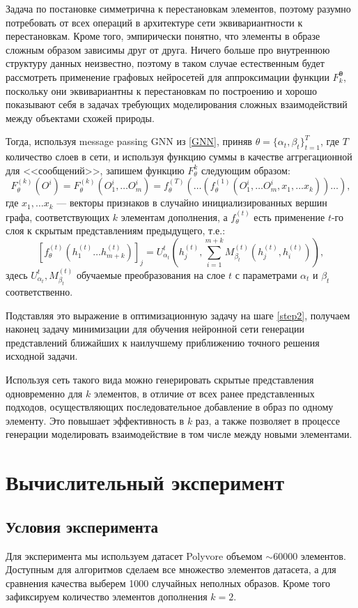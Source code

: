 \documentclass[a4paper,14pt]{extarticle}
\begin{document}
		
		Задача по постановке симметрична к перестановкам элементов, поэтому разумно потребовать от всех операций в архитектуре сети эквивариантности \cite{cohen2016group} к перестановкам. Кроме того, эмпирически понятно, что элементы в образе сложным образом зависимы друг от друга.
		Ничего больше про внутреннюю структуру данных неизвестно, поэтому в таком случае естественным будет рассмотреть применение графовых нейросетей для аппроксимации функции $F_k^\mathbf{\theta}$, поскольку они эквивариантны к перестановкам по построению и хорошо показывают себя в задачах требующих моделирования сложных взаимодействий между объектами схожей природы.
		
		Тогда, используя message passing GNN из \ref{GNN}, приняв $\theta = \{\alpha_t, \beta_t\}_{t=1}^{T}$, где $T$ количество слоев в сети, и используя функцию суммы в качестве аггрегационной для <<сообщений>>, запишем функцию $F^{k}_{\theta}$ следующим образом:
		$$F^{(k)}_{\theta}(O^i) = F^{(k)}_{\theta}(O^i_1,\dots O^i_m) = f_\theta^{(T)}\left(\dots \left(f_\theta^{(1)}(O^i_1,\dots O^i_m, x_1, \dots x_k)\right)\dots\right),$$
		где $x_1,\dots x_k$ --- векторы признаков в случайно инициализированных вершин графа, соответствующих $k$ элементам дополнения, а $f_\theta^{(t)}$ есть применение $t$-го слоя к скрытым представлениям предыдущего, т.е.:
		$$\left[f^{(t)}_\theta \left(h_1^{(t)}\dots h_{m+k}^{(t)}\right)\right]_j\! = U_{\alpha_t}^t\left(h^{(t)}_j, \sum_{i=1}^{m+k} M_{\beta_t}^{(t)}\left(h^{(t)}_j, h^{(t)}_i\right)   \right),$$
		здесь $U_{\alpha_t}^t, M_{\beta_t}^{(t)}$ обучаемые преобразования на слое $t$ с параметрами $\alpha_t$ и $\beta_t$ соответственно.
		
		Подставляя это выражение в оптимизационную задачу на шаге \ref{step2}, получаем наконец задачу минимизации для обучения нейронной сети генерации представлений ближайших к наилучшему приближению точного решения исходной задачи.
		
		Используя сеть такого вида можно генерировать скрытые представления одновременно для $k$ элементов, в отличие от всех ранее представленных подходов, осуществляющих последовательное добавление в образ по одному элементу. Это повышает эффективность в $k$ раз, а также позволяет в процессе генерации моделировать взаимодействие в том числе между новыми элементами.
		
		
		\section{Вычислительный эксперимент}
			\subsection{Условия эксперимента}
					Для эксперимента мы используем датасет Polyvore \cite{DBLP:journals/corr/HanWJD17} объемом  $\sim60000$ элементов. Доступным для алгоритмов сделаем все множество элементов датасета, а для сравнения качества выберем 1000 случайных неполных образов. Кроме того зафиксируем количество элементов дополнения $k=2$. 										
					
\end{document}

